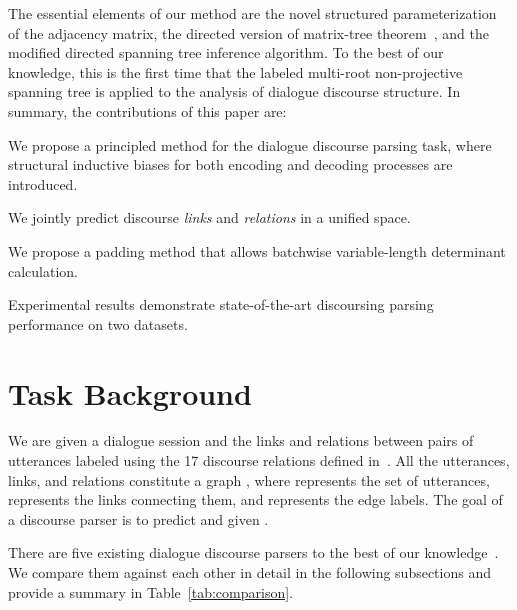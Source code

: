 \documentclass[11pt]{article}
\begin{document}
The essential elements of our method are the novel structured parameterization of the adjacency matrix, the directed version of matrix-tree theorem~\cite{tutte1984graph,koo2007structured}, and the modified directed spanning tree inference algorithm. To the best of our knowledge, this is the first time that the labeled multi-root non-projective spanning tree is applied to the analysis of dialogue discourse structure.
In summary, the contributions of this paper are:
\begin{compactitem}
    \item We propose a principled method for the dialogue discourse parsing task, where structural inductive biases for both encoding and decoding processes are introduced.
    \item We jointly predict discourse \emph{links} and \emph{relations} in a unified space.
    \item We propose a padding method that allows batchwise variable-length determinant calculation.
\item Experimental results demonstrate state-of-the-art discoursing parsing performance on two datasets.
\end{compactitem}

\section{Task Background}
\label{sec:task}
We are given a dialogue session  and the links and relations between pairs of utterances labeled using the 17 discourse relations defined in~\citet{asher2016discourse}. All the utterances, links, and relations constitute a graph , where  represents the set of utterances,  represents the links connecting them, and  represents the edge labels. The goal of a discourse parser is to predict  and  given .

There are five existing dialogue discourse parsers to the best of our knowledge~\cite{afantenos2015discourse,perret2016integer,shi2019deep,wangstructure,liu-chen-2021-improving}. We compare them against each other in detail in the following subsections and provide a summary in Table~\ref{tab:comparison}.
\end{document}
